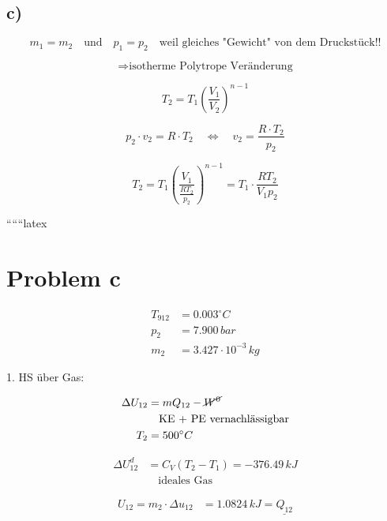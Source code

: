 

\subsection*{c)}
\[
m_1 = m_2 \quad \text{und} \quad p_1 = p_2 \quad \text{weil gleiches "Gewicht" von dem Druckstück!!}
\]

\[
\Rightarrow \text{isotherme Polytrope Veränderung}
\]

\[
T_2 = T_1 \left( \frac{V_1}{V_2} \right)^{n-1}
\]

\[
p_2 \cdot v_2 = R \cdot T_2 \quad \Leftrightarrow \quad v_2 = \frac{R \cdot T_2}{p_2}
\]

\[
T_2 = T_1 \left( \frac{V_1}{\frac{R T_2}{p_2}} \right)^{n-1} = T_1 \cdot \frac{R T_2}{V_1 p_2}
\]

``````latex

\section*{Problem c}

\begin{align*}
    T_{912} &= 0.003^\circ C \\
    p_2 &= 7.900 \, bar \\
    m_2 &= 3.427 \cdot 10^{-3} \, kg
\end{align*}

1. HS über Gas: \quad {}

\begin{align*}
    \Delta U_{12} &= m Q_{12} - \cancel{W^0} \\
    & \quad \text{KE + PE vernachlässigbar} \\
    T_2 &= 500^\circ C
\end{align*}

\begin{align*}
    \Delta U_{12}^d &= C_V (T_2 - T_1) = -376.49 \, kJ \\
    & \quad \text{ideales Gas}
\end{align*}

\begin{align*}
    U_{12} = m_2 \cdot \Delta u_{12} &= 1.0824 \, kJ = \underline{Q_{12}}
\end{align*}